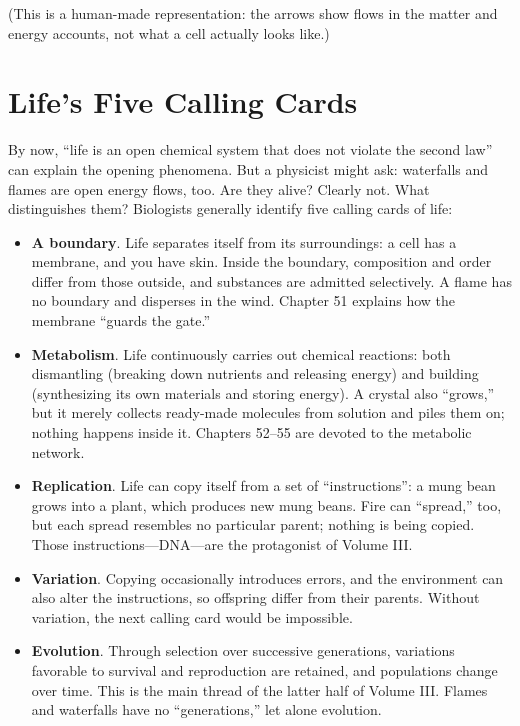 (This is a human-made representation: the arrows show flows in the matter and energy accounts, not what a cell actually looks like.)

\section{Life's Five Calling Cards}

By now, ``life is an open chemical system that does not violate the second law'' can explain the opening phenomena. But a physicist might ask: waterfalls and flames are open energy flows, too. Are they alive? Clearly not. What distinguishes them? Biologists generally identify five calling cards of life:

\begin{itemize}[itemsep=2pt]
\item \textbf{A boundary}. Life separates itself from its surroundings: a cell has a membrane, and you have skin. Inside the boundary, composition and order differ from those outside, and substances are admitted selectively. A flame has no boundary and disperses in the wind. Chapter 51 explains how the membrane ``guards the gate.''
\item \textbf{Metabolism}. Life continuously carries out chemical reactions: both dismantling (breaking down nutrients and releasing energy) and building (synthesizing its own materials and storing energy). A crystal also ``grows,'' but it merely collects ready-made molecules from solution and piles them on; nothing happens inside it. Chapters 52--55 are devoted to the metabolic network.
\item \textbf{Replication}. Life can copy itself from a set of ``instructions'': a mung bean grows into a plant, which produces new mung beans. Fire can ``spread,'' too, but each spread resembles no particular parent; nothing is being copied. Those instructions---DNA---are the protagonist of Volume III.
\item \textbf{Variation}. Copying occasionally introduces errors, and the environment can also alter the instructions, so offspring differ from their parents. Without variation, the next calling card would be impossible.
\item \textbf{Evolution}. Through selection over successive generations, variations favorable to survival and reproduction are retained, and populations change over time. This is the main thread of the latter half of Volume III. Flames and waterfalls have no ``generations,'' let alone evolution.
\end{itemize}

